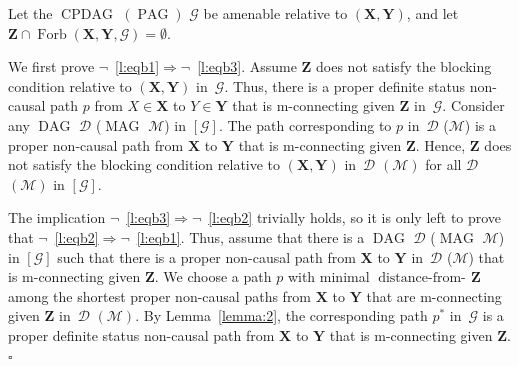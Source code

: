 \documentclass[11pt,a4paper]{article}
\newenvironment{proofof}[1][]{\begin{trivlist}
   \item[\hskip \labelsep {\bfseries Proof of #1.}]}{\hfill{}$\square$\end{trivlist}}
\DeclareMathOperator{\CPDAG}{CPDAG}
\DeclareMathOperator{\DAG}{DAG}
\DeclareMathOperator{\MAG}{MAG}
\DeclareMathOperator{\PAG}{PAG}
\DeclareMathOperator{\distancefrom}{distance-from-\!}
\DeclareMathOperator{\Forbi}{Forb}
\newcommand{\blck}{the blocking condition\xspace}
\newcommand{\g}[1][G]{\mathcal{#1}}
\newcommand{\fb}[2][X,Y]{\Forbi(\mathbf{#1},#2)}%
\newcommand{\pstar}[1][p]{{#1}^{*}}
\begin{document}
\begin{proofof}[Lemma~\ref{lemmaequivalenceofcondb}]
   Let the $\CPDAG$ $(\PAG)$ $\g$ be amenable relative to $(\mathbf{X},\mathbf{Y})$, and let $\mathbf{Z} \cap \fb{\g}=\emptyset$.

   We first prove $\neg$~\ref{l:eqb1}$\Rightarrow\neg$~\ref{l:eqb3}. Assume $\mathbf{Z}$ does not satisfy \blck relative to $(\mathbf{X},\mathbf{Y})$ in~$\g$.
   Thus, there is a proper definite status non-causal path $p$ from $X \in \mathbf{X}$ to $Y \in \mathbf{Y}$ that is m-connecting given $\mathbf{Z}$ in~$\g$. Consider any $\DAG$ $\g[D]$ ($\MAG$ $\g[M]$) in $[\g]$. The path corresponding to $p$ in~$\g[D]$ ($\g[M]$) is a proper non-causal path from $\mathbf{X}$ to $\mathbf{Y}$ that is m-connecting given $\mathbf{Z}$.
   Hence, $\mathbf{Z}$ does not satisfy \blck relative to $(\mathbf{X,Y})$ in~$\g[D]$ $(\g[M])$ for all $\g[D]$ $(\g[M])$ in $[\g]$.

The implication $\neg$~\ref{l:eqb3}$\Rightarrow\neg$~\ref{l:eqb2} trivially holds, so it is only left to prove that $\neg$~\ref{l:eqb2}$\Rightarrow\neg$~\ref{l:eqb1}.
   Thus, assume that there is a $\DAG$ $\g[D]$ ($\MAG$ $\g[M]$) in $[\g]$ such that there is a proper non-causal path from $\mathbf{X}$ to $\mathbf{Y}$ in~$\g[D]$ ($\g[M]$) that is m-connecting given $\mathbf{Z}$.
   We choose a path $p$ with minimal $\distancefrom{\mathbf{Z}}$ among the shortest proper non-causal paths from $\mathbf{X}$ to $\mathbf{Y}$ that are m-connecting given $\mathbf{Z}$ in~$\g[D]$ $(\g[M])$. By Lemma~\ref{lemma:2}, the corresponding path $\pstar$ in~$\g$ is a proper definite status non-causal path from $\mathbf{X}$ to $\mathbf{Y}$ that is m-connecting given $\mathbf{Z}$.
\end{proofof}
\end{document}
